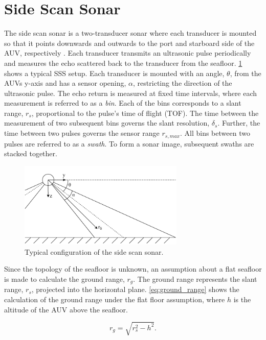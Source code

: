 \section{Side Scan Sonar}

The side scan sonar is a two-transducer sonar where each transducer is mounted so that it points downwards and outwards to the port and starboard side of the AUV, respectively \cite{Burguera2016High-ResolutionSonar}. Each transducer transmits an ultrasonic pulse periodically and measures the echo scattered back to the transducer from the seafloor. \cref{fig:sss} shows a typical SSS setup. Each transducer is mounted with an angle, $\theta$, from the AUVs y-axis and has a sensor opening, $\alpha$, restricting the direction of the ultrasonic pulse. The echo return is measured at fixed time intervals, where each measurement is referred to as a \textit{bin}. Each of the bins corresponds to a slant range, $r_s$, proportional to the pulse's time of flight (TOF). The time between the measurement of two subsequent bins governs the slant resolution, $\delta_s$. Further, the time between two pulses governs the sensor range $r_{s, max}$. All bins between two pulses are referred to as a \textit{swath}. To form a sonar image, subsequent swaths are stacked together.

\begin{figure}
    \centering
    \includegraphics[width=0.7\textwidth]{figures/sss.drawio.pdf}
    \caption{Typical configuration of the side scan sonar.}
    \label{fig:sss}
\end{figure}

Since the topology of the seafloor is unknown, an assumption about a flat seafloor is made to calculate the ground range, $r_g$. The ground range represents the slant range, $r_s$, projected into the horizontal plane. \cref{eq:ground_range} shows the calculation of the ground range under the flat floor assumption, where $h$ is the altitude of the AUV above the seafloor.

\begin{equation}
    r_g = \sqrt{r_s^2 - h^2}.
    \label{eq:ground_range}
\end{equation}

